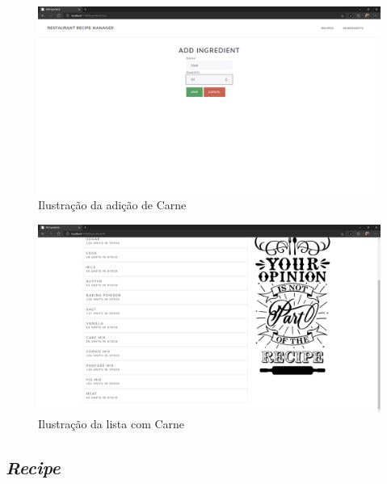 \FloatBarrier
\begin{figure}[!hbt]
    \centering
    \includegraphics[width=14cm]{Resources/WebApp/Ingredients/ingredient (7).png}
    \caption{Ilustração da adição de Carne}
    \label{fig:app_ing_7}
\end{figure}
\FloatBarrier
\begin{figure}[!hbt]
    \centering
    \includegraphics[width=14cm]{Resources/WebApp/Ingredients/ingredient (8).png}
    \caption{Ilustração da lista com Carne}
    \label{fig:app_ing_8}
\end{figure}
\FloatBarrier

\newpage
\subsection{\textit{Recipe}}


